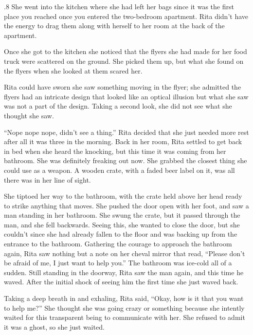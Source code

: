 \documentclass{article}
\begin{document}
\begin{tcolorbox}[colback=white, colframe=my-green, coltitle=black, parskip=5mm, title=
    \textbf{Human-written Story}, breakable]
\begin{spacing}{.8}
        She went into the kitchen where she had left her bags since it was the first place you reached once you entered the two-bedroom apartment. Rita didn’t have the energy to drag them along with herself to her room at the back of the apartment. \\\par
        Once she got to the kitchen she noticed that the flyers she had made for her food truck were scattered on the ground. She picked them up, but what she found on the flyers when she looked at them scared her. \\\par
        Rita could have sworn she saw something moving in the flyer; she admitted the flyers had an intricate design that looked like an optical illusion but what she saw was not a part of the design. Taking a second look, she did not see what she thought she saw.  \\\par
        “Nope nope nope, didn’t see a thing.” Rita decided that she just needed more rest after all it was three in the morning.
        Back in her room, Rita settled to get back in bed when she heard the knocking, but this time it was coming from her bathroom. She was definitely freaking out now. She grabbed the closest thing she could use as a weapon. A wooden crate, with a faded beer label on it, was all there was in her line of sight. \\\par
        She tiptoed her way to the bathroom, with the crate held above her head ready to strike anything that moves. She pushed the door open with her foot, and saw a man standing in her bathroom. She swung the crate, but it passed through the man, and she fell backwards. Seeing this, she wanted to close the door, but she couldn’t since she had already fallen to the floor and was backing up from the entrance to the bathroom. 
        Gathering the courage to approach the bathroom again, Rita saw nothing but a note on her cheval mirror that read, “Please don’t be afraid of me, I just want to help you.” The bathroom was ice-cold all of a sudden. Still standing in the doorway, Rita saw the man again, and this time he waved. After the initial shock of seeing him the first time she just waved back. \\\par
        Taking a deep breath in and exhaling, Rita said, “Okay, how is it that you want to help me?” She thought she was going crazy or something because she intently waited for this transparent being to communicate with her. She refused to admit it was a ghost, so she just waited. \\\par

\end{spacing}
\end{tcolorbox}
\end{document}
